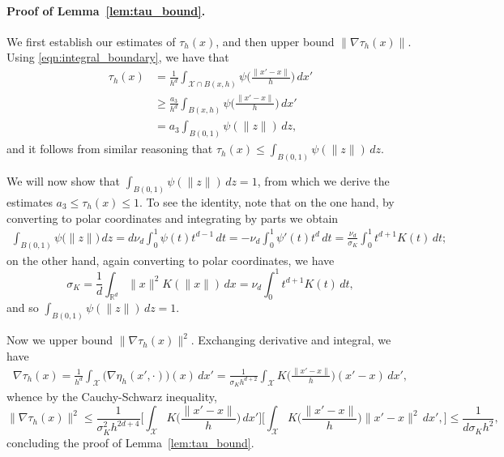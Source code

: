 \documentclass[twoside]{article}
\newcommand{\Reals}{\mathbb{R}}
\newcommand{\1}{\mathbf{1}}
\newcommand{\Xset}{\mathcal{X}}
\theoremstyle{definition}
\theoremstyle{remark}
\begin{document}
\paragraph{Proof of Lemma~\ref{lem:tau_bound}.}
We first establish our estimates of $\tau_h(x)$, and then upper bound $\|\nabla\tau_h(x)\|$. Using \eqref{eqn:integral_boundary}, we have that
\begin{align*}
\tau_h(x) & = \frac{1}{h^d} \int_{\Xset \cap B(x,h)} \psi\biggl(\frac{\|x' - x\|}{h}\biggr) \,dx' \\
& \geq \frac{a_3}{h^d} \int_{B(x,h)} \psi\biggl(\frac{\|x' - x\|}{h}\biggr) \,dx' \\
& = a_3\int_{B(0,1)} \psi(\|z\|) \,dz,
\end{align*}
and it follows from similar reasoning that $\tau_h(x) \leq \int_{B(0,1)} \psi(\|z\|) \,dz$. 

We will now show that $\int_{B(0,1)} \psi(\|z\|) \,dz = 1$, from which we derive the estimates $a_3 \leq \tau_h(x) \leq 1$. To see the identity, note that on the one hand, by converting to polar coordinates and integrating by parts we obtain
\begin{align*}
\int_{B(0,1)} \psi\bigl(\|z\|\bigr) \,dz = d \nu_d \int_{0}^{1} \psi(t) t^{d - 1} \,dt = -\nu_d \int_{0}^{1} \psi'(t) t^{d} \,dt = \frac{\nu_d}{\sigma_K} \int_{0}^{1} t^{d + 1} K(t) \,dt;
\end{align*}
on the other hand, again converting to polar coordinates, we have
\begin{equation*}
\sigma_K = \frac{1}{d} \int_{\Reals^d} \|x\|^2 K(\|x\|) \,dx = \nu_d \int_{0}^{1}t^{d + 1} K(t) \,dt,
\end{equation*}
and so $\int_{B(0,1)} \psi(\|z\|) \,dz = 1$.

Now we upper bound $\|\nabla\tau_h(x)\|^2$. Exchanging derivative and integral, we have
\begin{align*}
\nabla\tau_h(x) = \frac{1}{h^d} \int_{\Xset} \bigl(\nabla \eta_h(x',\cdot)\bigr)(x) \,dx' = \frac{1}{\sigma_K h^{d + 2}} \int_{\Xset} K\biggl(\frac{\|x' - x\|}{h}\biggr)(x' - x)\,dx',
\end{align*}
whence by the Cauchy-Schwarz inequality,
\begin{equation*}
\|\nabla\tau_h(x)\|^2 \leq \frac{1}{\sigma_K^2 h^{2d + 4}} \biggl[\int_{\Xset} K\biggl(\frac{\|x' - x\|}{h}\biggr)\,dx'\biggr] \biggl[\int_{\Xset} K\biggl(\frac{\|x' - x\|}{h}\biggr)\|x' - x\|^2\,dx',\biggr] \leq \frac{1}{d\sigma_K h^{2}},
\end{equation*}
concluding the proof of Lemma~\ref{lem:tau_bound}. 
\end{document}
